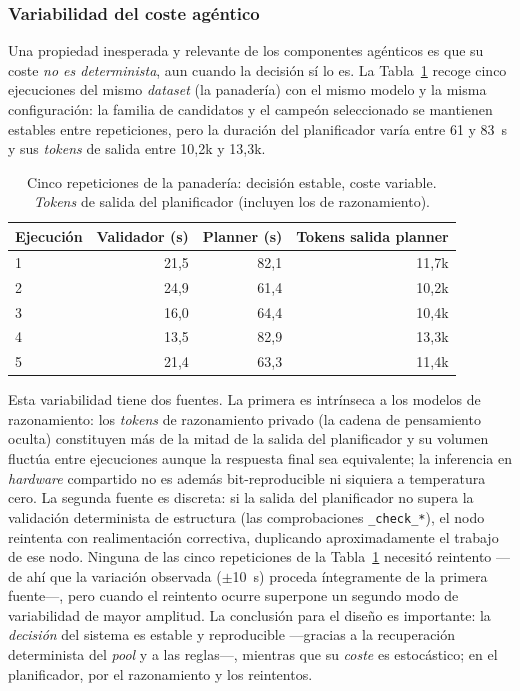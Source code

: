 
\subsubsection{Variabilidad del coste agéntico}
\label{sec:coste-variabilidad}

Una propiedad inesperada y relevante de los componentes agénticos es que su coste
\emph{no es determinista}, aun cuando la decisión sí lo es. La Tabla~\ref{tab:variabilidad}
recoge cinco ejecuciones del mismo \textit{dataset} (la panadería) con el mismo modelo
y la misma configuración: la familia de candidatos y el campeón seleccionado se mantienen
estables entre repeticiones, pero la duración del planificador varía entre 61 y 83~s y
sus \textit{tokens} de salida entre 10,2k y 13,3k.

\begin{table}[H]
\centering
\caption{Cinco repeticiones de la panadería: decisión estable, coste variable.
 \textit{Tokens} de salida del planificador (incluyen los de razonamiento).}
\label{tab:variabilidad}
\small
\begin{tabular}{lrrr}
\toprule
\textbf{Ejecución} & \textbf{Validador (s)} & \textbf{Planner (s)}
  & \textbf{Tokens salida planner} \\
\midrule
1 & 21,5 & 82,1 & 11,7k \\
2 & 24,9 & 61,4 & 10,2k \\
3 & 16,0 & 64,4 & 10,4k \\
4 & 13,5 & 82,9 & 13,3k \\
5 & 21,4 & 63,3 & 11,4k \\
\bottomrule
\end{tabular}
\end{table}

Esta variabilidad tiene dos fuentes. La primera es intrínseca a los modelos de
razonamiento: los \textit{tokens} de razonamiento privado (la cadena de pensamiento
oculta) constituyen más de la mitad de la salida del planificador y su volumen fluctúa
entre ejecuciones aunque la respuesta final sea equivalente; la inferencia en
\textit{hardware} compartido no es además bit-reproducible ni siquiera a temperatura
cero. La segunda fuente es discreta: si la salida del planificador no supera la
validación determinista de estructura (las comprobaciones \texttt{\_check\_*}), el nodo
reintenta con realimentación correctiva, duplicando aproximadamente el trabajo de ese nodo.
Ninguna de las cinco repeticiones de la Tabla~\ref{tab:variabilidad} necesitó reintento
—de ahí que la variación observada ($\pm$10~s) proceda íntegramente de la primera fuente—,
pero cuando el reintento ocurre superpone un segundo modo de variabilidad de mayor
amplitud. La conclusión
para el diseño es importante: la \emph{decisión} del sistema es estable y reproducible
—gracias a la recuperación determinista del \textit{pool} y a las reglas—, mientras que
su \emph{coste} es estocástico; en el planificador, por el razonamiento y los reintentos.

